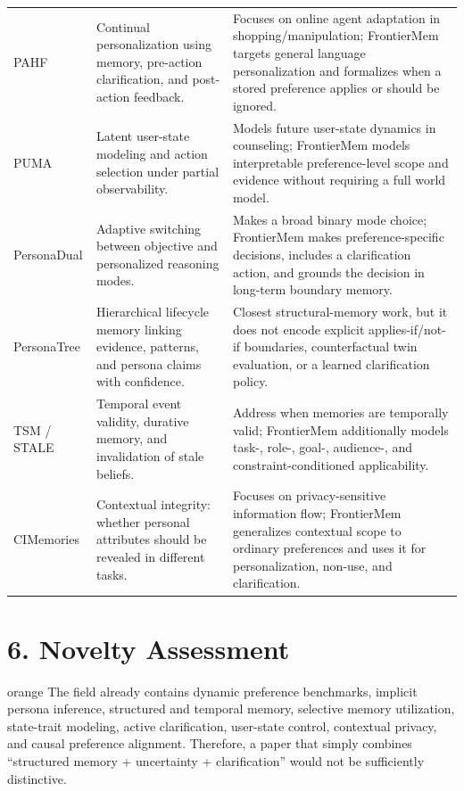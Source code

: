 \documentclass[10.5pt,a4paper]{article}
\begin{document}
\begin{longtable}{P{2.15cm}P{3.05cm}P{10.65cm}}
PAHF \cite{pahf} & Continual personalization using memory, pre-action clarification, and post-action feedback. & Focuses on online agent adaptation in shopping/manipulation; FrontierMem targets general language personalization and formalizes when a stored preference applies or should be ignored.\\
PUMA \cite{puma} & Latent user-state modeling and action selection under partial observability. & Models future user-state dynamics in counseling; FrontierMem models interpretable preference-level scope and evidence without requiring a full world model.\\
PersonaDual \cite{personadual} & Adaptive switching between objective and personalized reasoning modes. & Makes a broad binary mode choice; FrontierMem makes preference-specific decisions, includes a clarification action, and grounds the decision in long-term boundary memory.\\
PersonaTree \cite{personatree} & Hierarchical lifecycle memory linking evidence, patterns, and persona claims with confidence. & Closest structural-memory work, but it does not encode explicit applies-if/not-if boundaries, counterfactual twin evaluation, or a learned clarification policy.\\
TSM / STALE \cite{tsm,stale} & Temporal event validity, durative memory, and invalidation of stale beliefs. & Address when memories are temporally valid; FrontierMem additionally models task-, role-, goal-, audience-, and constraint-conditioned applicability.\\
CIMemories \cite{cimemories} & Contextual integrity: whether personal attributes should be revealed in different tasks. & Focuses on privacy-sensitive information flow; FrontierMem generalizes contextual scope to ordinary preferences and uses it for personalization, non-use, and clarification.\\
\end{longtable}
\normalsize

\section{6. Novelty Assessment}

\begin{keybox}{orange}
The field already contains dynamic preference benchmarks, implicit persona inference, structured and temporal memory, selective memory utilization, state-trait modeling, active clarification, user-state control, contextual privacy, and causal preference alignment. Therefore, a paper that simply combines ``structured memory + uncertainty + clarification'' would not be sufficiently distinctive.
\end{keybox}
\end{document}
